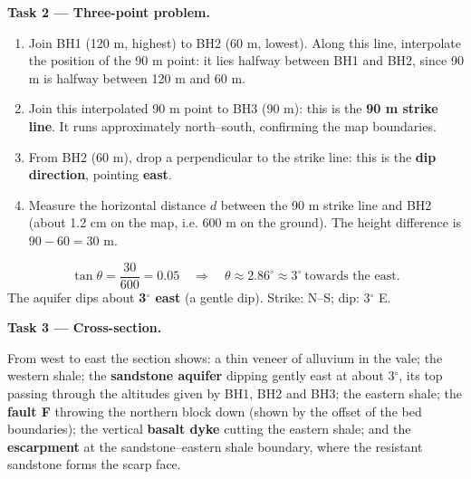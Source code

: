 \documentclass[11pt]{article}
\begin{document}
\textbf{Task 2 — Three-point problem.}\par
\begin{methode}[Solution]
\begin{enumerate}
\item Join BH1 (120 m, highest) to BH2 (60 m, lowest). Along this line, interpolate the position of the 90 m point: it lies halfway between BH1 and BH2, since 90 m is halfway between 120 m and 60 m.
\item Join this interpolated 90 m point to BH3 (90 m): this is the \textbf{90 m strike line}. It runs approximately north--south, confirming the map boundaries.
\item From BH2 (60 m), drop a perpendicular to the strike line: this is the \textbf{dip direction}, pointing \textbf{east}.
\item Measure the horizontal distance $d$ between the 90 m strike line and BH2 (about 1.2 cm on the map, i.e. 600 m on the ground). The height difference is $90 - 60 = 30$ m.
\end{enumerate}
\end{methode}
\[
\tan \theta = \frac{30}{600} = 0.05 \quad\Rightarrow\quad \theta \approx 2.86^{\circ} \approx 3^{\circ}\ \text{towards the east}.
\]
The aquifer dips about \textbf{3$^{\circ}$ east} (a gentle dip). Strike: N--S; dip: 3$^{\circ}$ E.

\textbf{Task 3 — Cross-section.}\par
From west to east the section shows: a thin veneer of alluvium in the vale; the western shale; the \textbf{sandstone aquifer} dipping gently east at about 3$^{\circ}$, its top passing through the altitudes given by BH1, BH2 and BH3; the eastern shale; the \textbf{fault F} throwing the northern block down (shown by the offset of the bed boundaries); the vertical \textbf{basalt dyke} cutting the eastern shale; and the \textbf{escarpment} at the sandstone--eastern shale boundary, where the resistant sandstone forms the scarp face.
\end{document}
